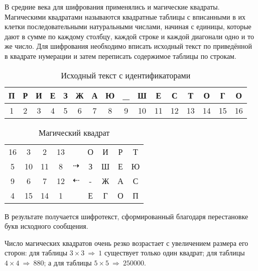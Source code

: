 В средние века для шифрования применялись и магические квадраты. Магическими
квадратами называются квадратные таблицы с вписанными в их клетки
последовательными натуральными числами, начиная с единицы, которые дают в
сумме по каждому столбцу, каждой строке и каждой диагонали одно и то же
число. Для шифрования необходимо вписать исходный текст по приведённой в
квадрате нумерации и затем переписать содержимое таблицы по строкам.
\begin{table} [htbp]%
  \centering
  \parbox{14cm}{%
    \caption{Исходный текст с идентификаторами}%
    \label{tabl:tab2x4}%
    \begin{SingleSpace}
\begin{tabular}{c|c|c|c|c|c|c|c|c|c|c|c|c|c|c|c}
П & Р & И & Е & З & Ж & А & Ю & \_ & Ш & Е & С & Т & О & Г & О \\ \hline
1 & 2 & 3 & 4 & 5 & 6 & 7 & 8 & 9 & 10 & 11 & 12 & 13 & 14 & 15 & 16 \\
\end{tabular}
    \end{SingleSpace}
  }
\end{table}
\begin{table}%
  \centering
  \parbox{10cm}{%
    \caption{Магический квадрат}%
    \label{tabl:tab2x5}%
    \begin{SingleSpace}
      \begin{tabular}{|c|c|c|c|c|c|c|c|c|}
\cline{1-4} \cline{6-9}
16 & 3  & 2  & 13 &                     & О & И & Р & Т \\ \cline{1-4} \cline{6-9}
5  & 10 & 11 & 8  & {\Huge $\dashrightarrow$} & З & Ш & Е & Ю \\ \cline{1-4} \cline{6-9}
9  & 6  & 7  & 12 & {\Huge $\dashleftarrow$}  & - & Ж & А & С \\ \cline{1-4} \cline{6-9}
4  & 15 & 14 & 1  &                     & Е & Г & О & П \\ \cline{1-4} \cline{6-9}
      \end{tabular}
    \end{SingleSpace}
  }
\end{table}
В результате получается шифротекст, сформированный благодаря перестановке
букв исходного сообщения.

Число магических квадратов очень резко возрастает с увеличением размера его
сторон: для таблицы $3\times 3~\Rightarrow~1$ существует только один квадрат;
для таблицы $4\times 4~\Rightarrow~880$; а для таблицы $5\times
5~\Rightarrow~250 000$.


